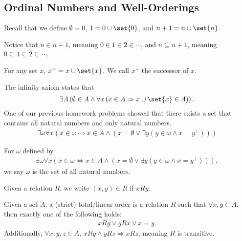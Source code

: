 \documentclass[10pt]{mypackage}
\begin{document}
\subsection{Ordinal Numbers and Well-Orderings}%
\begin{recall}
Recall that we define $\emptyset = 0$, $1 = 0 \cup \set{0}$, and $n+1 = n \cup \set{n}$.\newline

Notice that $n\in n + 1$, meaning $0\in 1 \in 2 \in \cdots $, and $n\subseteq n+ 1$, meaning $0\subseteq 1 \subseteq 2 \subseteq \cdots$.
\end{recall}
\begin{notation}
  For any set $x$, $x^{+} = x\cup \set{x}$. We call $x^{+}$ the successor of $x$.
\end{notation}
\begin{recall}
The infinity axiom states that
\begin{align*}
  \exists A \left(\emptyset\in A \wedge \forall x \left(x\in A \Rightarrow x\cup \set{x}\in A\right)\right).
\end{align*}
One of our previous homework problems showed that there exists a set that contains all natural numbers and only natural numbers.
\begin{align*}
  \exists \omega \forall x \left(x\in \omega \Leftrightarrow x\in A \wedge \left(x= \emptyset \vee \exists y\left(y\in \omega \wedge x = y^{+}\right)\right)\right)
\end{align*}
\end{recall}
\begin{definition}
  For $\omega$ defined by
  \begin{align*}
    \exists \omega \forall x \left(x\in \omega \Leftrightarrow x\in A \wedge \left(x= \emptyset \vee \exists y\left(y\in \omega \wedge x = y^{+}\right)\right)\right),
  \end{align*}
  we say $\omega$ is the set of all natural numbers.
\end{definition}
\begin{remark}
Given a relation $R$, we write $(x,y)\in R$ if $xRy$.
\end{remark}
\begin{definition}
  Given a set $A$, a (strict) total/linear order is a relation $R$ such that $\forall x,y\in A$, then exactly one of the following holds:
  \begin{align*}
    xRy \vee yRx \vee x=  y.
  \end{align*}
  Additionally, $\forall x,y,z\in A$, $xRy\wedge yRz \Rightarrow xRz$, meaning $R$ is transitive.
\end{definition}
\end{document}

